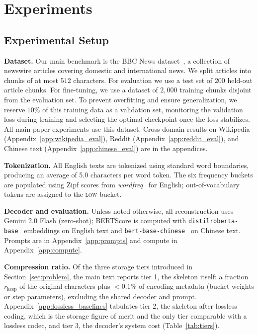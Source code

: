 \documentclass[11pt]{article}
\newcommand{\rkeep}{r_{\mathrm{keep}}}
\begin{document}
\section{Experiments}

\label{sec:experiments}
\subsection{Experimental Setup}
\textbf{Dataset.}
\label{sec:dataset}
Our main benchmark is the BBC News dataset~\citep{kalpande2023bbcnews}, a collection of newswire
articles covering domestic and international news.  We split articles into chunks of at most $512$ characters.  For evaluation we use a test set of $200$ held-out article chunks. For fine-tuning, we use a dataset of $2{,}000$ training chunks disjoint from the evaluation set. To prevent overfitting and ensure generalization, we reserve $10\%$ of this training data as a validation set, monitoring the validation loss during training and selecting the optimal checkpoint once the loss stabilizes. All main-paper experiments use this dataset. Cross-domain results on Wikipedia (Appendix~\ref{app:wikipedia_eval}), Reddit (Appendix~\ref{app:reddit_eval}), and Chinese text (Appendix~\ref{app:chinese_eval}) are in the appendices.

\textbf{Tokenization.}
All English texts are tokenized using standard word boundaries,
producing an average of 5.0 characters per word token.
The six frequency buckets are populated using Zipf scores
from \textit{wordfreq}~\citep{speer2022wordfreq} for
English; out-of-vocabulary tokens are assigned
to the \textsc{low} bucket.

\textbf{Decoder and evaluation.}
Unless noted otherwise, all reconstruction uses Gemini 2.0 Flash (zero-shot); BERTScore is computed with \texttt{distilroberta-base}~\citep{sanh2019distilbert} embeddings on English text and \texttt{bert-base-chinese}~\citep{devlin2019bert} on Chinese text. Prompts are in Appendix~\ref{app:prompts} and compute in Appendix~\ref{app:compute}.

\textbf{Compression ratio.}
Of the three storage tiers introduced in Section~\ref{sec:problem}, the main text reports tier 1, the skeleton itself: a fraction $\rkeep$ of the original characters plus ${<}0.1\%$ of encoding metadata (bucket weights or step parameters), excluding the shared decoder and prompt. Appendix~\ref{app:lossless_baselines} tabulates tier 2, the skeleton after lossless coding, which is the storage figure of merit and the only tier comparable with a lossless codec, and tier 3, the decoder's system cost (Table~\ref{tab:tiers}).
\end{document}
